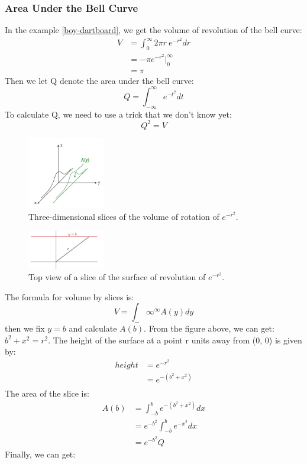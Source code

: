 \documentclass[10pt, a4paper]{article}
\begin{document}
\subsubsection*{Area Under the Bell Curve}
In the example \ref{boy-dartboard}, we get the volume of revolution of the bell curve:
\begin{align*}
    V &= \int_0^\infty2\pi r\mathrm{~}e^{-r^2}dr\\
    &= -\pi e^{-r^2}\Big|_0^\infty\\
    &= \pi
\end{align*}
Then we let Q denote the area under the bell curve:
\[ Q = \int_{-\infty}^\infty e^{-t^2}dt \]
To calculate Q, we need to use a trick that we don't know yet:
\[\boxed{Q^2  = V}\]
\begin{figure}
    \centering
    \includegraphics[width=0.3\textwidth]{Slices.jpg}
    \caption{Three-dimensional slices of the volume of rotation of $e^{-r^2}$.}
\end{figure}
\begin{figure}
    \centering
    \includegraphics[width=0.3\textwidth]{topview.jpg}
    \caption{Top view of a slice of the surface of revolution of $e^{-r^2}$.}
\end{figure}

The formula for volume by slices is:
\[ V = \int_-\infty^\infty A(y)dy \]
then we fix $y= b$ and calculate $A(b)$. From the figure above, we can get: $b^2 + x^2 = r^2$. 
The height of the surface at a point r units away from (0, 0) is given by: 
\begin{align*}
    height &= e^{-r^2} \\
    &= e^{-(b^2 + x^2)} \\
\end{align*}
The area of the slice is:
\begin{align*}
    A(b) &= \int_{-b}^b e^{-(b^2 + x^2)}dx \\
    &= e^{-b^2}\int_{-b}^b e^{-x^2}dx \\
    &= e^{-b^2}Q
\end{align*}
Finally, we can get:
\end{document}
